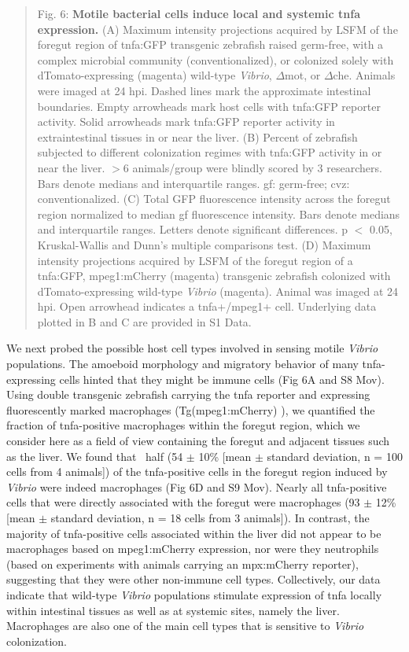 \begin{quote}
Fig. 6: \textbf{Motile bacterial cells induce local and systemic tnfa expression.} (A) Maximum intensity projections acquired by LSFM of the foregut region of tnfa:GFP transgenic zebrafish raised germ-free, with a complex microbial community (conventionalized), or colonized solely with dTomato-expressing (magenta) wild-type \textit{Vibrio}, $\Delta$mot, or $\Delta$che. Animals were imaged at 24 hpi. Dashed lines mark the approximate intestinal boundaries. Empty arrowheads mark host cells with tnfa:GFP reporter activity. Solid arrowheads mark tnfa:GFP reporter activity in extraintestinal tissues in or near the liver. (B) Percent of zebrafish subjected to different colonization regimes with tnfa:GFP activity in or near the liver. $ > $6 animals/group were blindly scored by 3 researchers. Bars denote medians and interquartile ranges. gf: germ-free; cvz: conventionalized. (C) Total GFP fluorescence intensity across the foregut region normalized to median gf fluorescence intensity. Bars denote medians and interquartile ranges. Letters denote significant differences. p $ < $ 0.05, Kruskal-Wallis and Dunn's multiple comparisons test. (D) Maximum intensity projections acquired by LSFM of the foregut region of a tnfa:GFP, mpeg1:mCherry (magenta) transgenic zebrafish colonized with dTomato-expressing wild-type \textit{Vibrio} (magenta). Animal was imaged at 24 hpi. Open arrowhead indicates a tnfa+/mpeg1+ cell. Underlying data plotted in B and C are provided in S1 Data.
\end{quote}

We next probed the possible host cell types involved in sensing motile \textit{Vibrio} populations. The amoeboid morphology and migratory behavior of many tnfa-expressing cells hinted that they might be immune cells (Fig 6A and S8 Mov). Using double transgenic zebrafish carrying the tnfa reporter and expressing fluorescently marked macrophages (Tg(mpeg1:mCherry) \cite{ellett_mpeg1_2011}), we quantified the fraction of tnfa-positive macrophages within the foregut region, which we consider here as a field of view containing the foregut and adjacent tissues such as the liver. We found that ~half (54 $\pm$ 10\% [mean $\pm$ standard deviation, n = 100 cells from 4 animals]) of the tnfa-positive cells in the foregut region induced by \textit{Vibrio} were indeed macrophages (Fig 6D and S9 Mov). Nearly all tnfa-positive cells that were directly associated with the foregut were macrophages (93 $\pm$ 12\% [mean $\pm$ standard deviation, n = 18 cells from 3 animals]). In contrast, the majority of tnfa-positive cells associated within the liver did not appear to be macrophages based on mpeg1:mCherry expression, nor were they neutrophils (based on experiments with animals carrying an mpx:mCherry reporter), suggesting that they were other non-immune cell types. Collectively, our data indicate that wild-type \textit{Vibrio} populations stimulate expression of tnfa locally within intestinal tissues as well as at systemic sites, namely the liver. Macrophages are also one of the main cell types that is sensitive to \textit{Vibrio} colonization.


